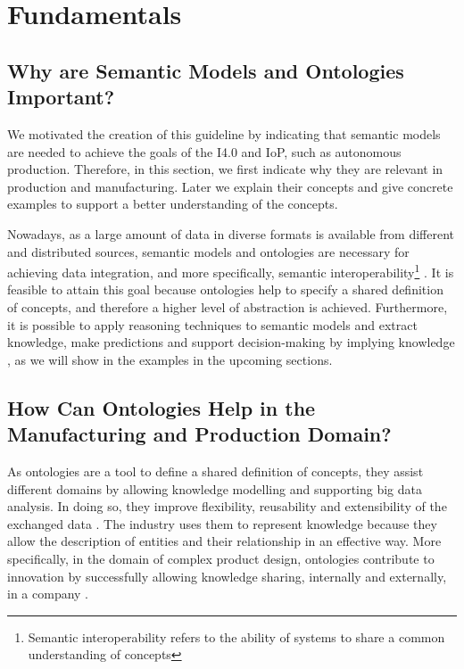 \documentclass{guideline/sty/rapport}
\begin{document}
\section{Fundamentals} \label{sec:fundamentals}


\subsection{Why are Semantic Models and Ontologies Important?}
We motivated the creation of this guideline by indicating that semantic models are needed to achieve the goals of the \ac{I4.0} and \ac{IoP}, such as autonomous production. Therefore, in this section, we first indicate why they are relevant in production and manufacturing. Later we explain their concepts and give concrete examples to support a better understanding of the concepts.  \singlespacing

Nowadays, as a large amount of data in diverse formats is available from different and distributed sources, semantic models and ontologies are necessary for achieving data integration, and more specifically, semantic interoperability\footnote{Semantic interoperability refers to the ability of systems to share a common understanding of concepts} \cite{Wache01}. It is feasible to attain this goal because ontologies help to specify a shared definition of concepts, and therefore a higher level of abstraction is achieved. Furthermore, it is possible to apply reasoning techniques to semantic models and extract knowledge, make predictions and support decision-making by implying knowledge \cite{Noy01, Psarommatis22}, as we will show in the examples in the upcoming sections. 

\subsection{How Can Ontologies Help in the Manufacturing and Production Domain?}

As ontologies are a tool to define a shared definition of concepts, they assist different domains by allowing knowledge modelling and supporting big data analysis. In doing so, they improve flexibility, reusability and extensibility of the exchanged data \cite{Georgieva21,Peng13,Psarommatis22}. The industry uses them to represent knowledge because they allow the description of entities and their relationship in an effective way. More specifically, in the domain of complex product design, ontologies contribute to innovation by successfully allowing knowledge sharing, internally and externally, in a company \cite{Zhou21}. \singlespacing
\end{document}
